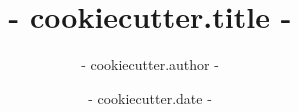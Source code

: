 \title{ {{- cookiecutter.title -}} }
\date{ {{- cookiecutter.date -}} }
\author{ {{- cookiecutter.author -}} }
